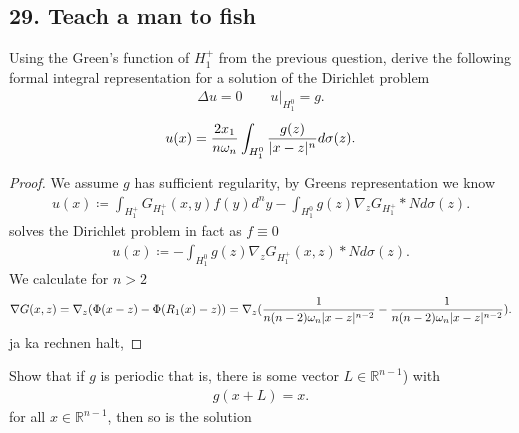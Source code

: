 \subsection*{29. Teach a man to fish}
\begin{exercise}[a]
 Using the Green's function of $H_1^{+} $  from the previous question, derive the following formal 
 integral representation for a solution of the Dirichlet problem 
 \begin{align*}
   \Delta u  = 0 \qquad u \rvert_{H_1^{0} }   = g
 .\end{align*}
 \begin{align*}
   u(x) = \frac{2x_{1}}{n \omega_n} \int_{H_{1}^{0} } \frac{g(z)}{\lvert x-z\rvert^{n} } d \sigma(z)
 .\end{align*}
\end{exercise}
\begin{proof}
 We assume $g$ has sufficient regularity, by Greens representation we know
 \begin{align*}
   u(x) \coloneqq  \int_{H_1^{+}} G_{H_1^{+} }(x,y) f(y) d^{n}y  - \int_{H_1^{0} } g(z) \nabla_z G_{H_1^{+} } * N d \sigma(z)
 .\end{align*}
 solves the Dirichlet problem in fact  as $f \equiv 0$
\begin{align*}
  u(x) \coloneqq  - \int_{H_1^{0} } g(z) \nabla_z G_{H_1^{+} }(x,z) * N d \sigma(z)
.\end{align*}
We calculate for $n>2$
\begin{align*}
 \nabla G(x,z) = \nabla_z (\Phi(x-z)-\Phi(R_{1}(x)-z))  = \nabla_z (\frac{1}{n(n-2)\omega_n \lvert x-z\rvert^{n-2} }-\frac{1}{n(n-2)\omega_n \lvert x-z\rvert^{n-2} })
.\end{align*}
ja ka rechnen halt,
\end{proof}
\begin{exercise}[b]
 Show that if $g$ is periodic that is, there is some vector $L \in  \mathbb{R}^{n-1} $)  with 
 \begin{align*}
  g(x+L) = x
 .\end{align*}
 for all $x \in  \mathbb{R}^{n-1} $, then so is the solution
\end{exercise}
